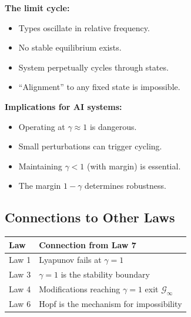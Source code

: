 \documentclass[12pt]{article}
\begin{document}
\textbf{The limit cycle:}
\begin{itemize}
    \item Types oscillate in relative frequency.
    \item No stable equilibrium exists.
    \item System perpetually cycles through states.
    \item ``Alignment'' to any fixed state is impossible.
\end{itemize}

\textbf{Implications for AI systems:}
\begin{itemize}
    \item Operating at $\gamma \approx 1$ is dangerous.
    \item Small perturbations can trigger cycling.
    \item Maintaining $\gamma < 1$ (with margin) is essential.
    \item The margin $1 - \gamma$ determines robustness.
\end{itemize}

\subsection{Connections to Other Laws}

\begin{center}
\begin{tabular}{ll}
\toprule
\textbf{Law} & \textbf{Connection from Law 7} \\
\midrule
Law 1 & Lyapunov fails at $\gamma = 1$ \\
Law 3 & $\gamma = 1$ is the stability boundary \\
Law 4 & Modifications reaching $\gamma = 1$ exit $\mathcal{G}_\infty$ \\
Law 6 & Hopf is the mechanism for impossibility \\
\bottomrule
\end{tabular}
\end{center}

\end{document}
